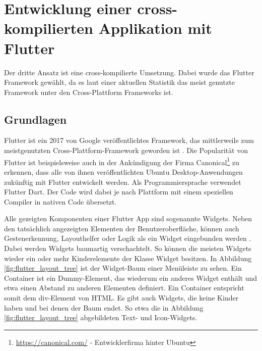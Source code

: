 \section{Entwicklung einer cross-kompilierten Applikation mit Flutter}
Der dritte Ansatz ist eine cross-kompilierte Umsetzung. Dabei wurde das Flutter Framework gewählt, da es laut einer aktuellen Statistik \cite{statist_CP_Framework} das meist genutzte Framework unter den Cross-Plattform Frameworks ist.

\subsection{Grundlagen}
\label{cha:4_3_1}
Flutter ist ein 2017 von Google veröffentlichtes Framework, das mittlerweile zum meistgenutzten Cross-Plattform-Framework geworden ist \cite{statist_CP_Framework}. Die Popularität von Flutter ist beispielsweise auch in der Ankündigung der Firma Canonical\footnote{\url{https://canonical.com/} - Entwicklerfirma hinter Ubuntu} zu erkennen, dass alle von ihnen veröffentlichten Ubuntu Desktop-Anwendungen zukünftig mit Flutter entwickelt werden\cite{Ubuntu_Flutter}. Als Programmiersprache verwendet Flutter Dart. Der Code wird dabei je nach Plattform mit einem speziellen Compiler in nativen Code übersetzt\cite{flutter_compilation}.

Alle gezeigten Komponenten einer Flutter App sind sogenannte Widgets. Neben den tatsächlich angezeigten Elementen der Benutzeroberfläche, können auch Gestenerkennung, Layouthelfer oder Logik als ein Widget eingebunden werden \cite{Thiele_2018}. Dabei werden Widgets baumartig verschachtelt. So können die meisten Widgets wieder ein oder mehr Kinderelemente der Klasse Widget besitzen. In Abbildung \ref{fig:flutter_layout_tree} ist der Widget-Baum einer Menüleiste zu sehen. Ein Container ist ein Dummy-Element, das wiederum ein anderes Widget enthält und etwa einen Abstand zu anderen Elementen definiert. Ein Container entspricht somit dem div-Element von HTML. Es gibt auch Widgets, die keine Kinder haben und bei denen der Baum endet. So etwa die in Abbildung \ref{fig:flutter_layout_tree} abgebildeten Text- und Icon-Widgets.

